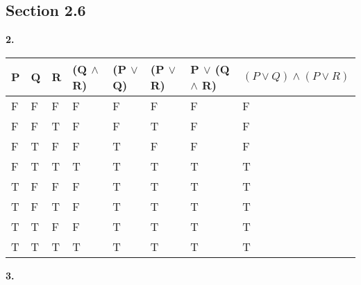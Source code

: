 \documentclass[12pt]{article}
\begin{document}
\subsection*{Section 2.6}
\textbf{2.}
\begin{table}[!h]
\centering
\begin{tabular}{|l|l|l|l|l|l|l|l|}
\hline
\rowcolor[HTML]{EFEFEF} 
\textbf{P} & \textbf{Q} & \textbf{R} & \textbf{(Q $\land$ R)} & \textbf{(P $\lor$Q)} & \textbf{(P $\lor$ R)} & \textbf{P $\lor$ (Q $\land$ R)} & \textbf{$(P \lor Q) \land (P \lor R)$} \\ \hline
F          & F          & F          & F                      & F                    & F                     & F                               & F                                      \\ \hline
F          & F          & T          & F                      & F                    & T                     & F                               & F                                      \\ \hline
F          & T          & F          & F                      & T                    & F                     & F                               & F                                      \\ \hline
F          & T          & T          & T                      & T                    & T                     & T                               & T                                      \\ \hline
T          & F          & F          & F                      & T                    & T                     & T                               & T                                      \\ \hline
T          & F          & T          & F                      & T                    & T                     & T                               & T                                      \\ \hline
T          & T          & F          & F                      & T                    & T                     & T                               & T                                      \\ \hline
T          & T          & T          & T                      & T                    & T                     & T                               & T                                      \\ \hline
\end{tabular}
\end{table}
\newpage
\textbf{3.}
\end{document}
